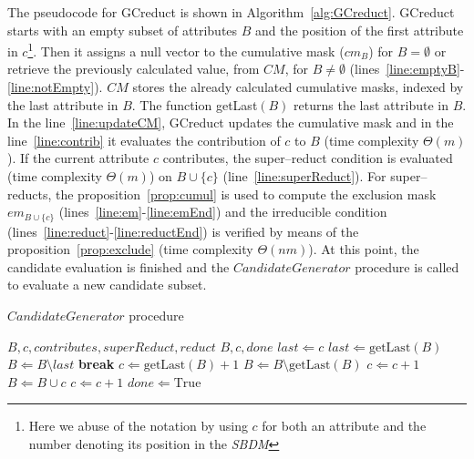 \documentclass[number,preprint,review,12pt]{elsarticle}
\begin{document}
	The pseudocode for GCreduct is shown in Algorithm~\ref{alg:GCreduct}. GCreduct starts with an empty subset of attributes $B$ and the position of the first attribute in $c$\footnote{Here we abuse of the notation by using $c$ for both an attribute and the number denoting its position in the \textit{SBDM}}. Then it assigns a null vector to the cumulative mask ($cm_B$) for $B=\emptyset$ or retrieve the previously calculated value, from $CM$, for $B\neq \emptyset$ (lines~\ref{line:emptyB}-\ref{line:notEmpty}). $CM$ stores the already calculated cumulative masks, indexed by the last attribute in $B$. The function getLast$(B)$ returns the last attribute in $B$. In the line~\ref{line:updateCM}, GCreduct updates the cumulative mask and in the line~\ref{line:contrib} it evaluates the contribution of $c$ to $B$ (time complexity $\Theta(m)$). If the current attribute $c$ contributes, the super--reduct condition is evaluated (time complexity $\Theta(m)$) on $B\cup \lbrace c\rbrace$ (line~\ref{line:superReduct}). For super--reducts, the proposition~\ref{prop:cumul} is used to compute the exclusion mask $em_{B\cup \lbrace c\rbrace}$ (lines~\ref{line:em}-\ref{line:emEnd}) and the irreducible condition (lines~\ref{line:reduct}-\ref{line:reductEnd}) is verified by means of the proposition~\ref{prop:exclude} (time complexity $\Theta(nm)$). At this point, the candidate evaluation is finished and the $CandidateGenerator$ procedure is called to evaluate a new candidate subset.
		
	\begin{algorithm}
		\footnotesize
		\caption{$CandidateGenerator$ procedure}
		\label{alg:CandGenerator}
		\begin{algorithmic}[1]
			\Require \textit{$B,c,contributes,superReduct,reduct$}
			\Ensure $B,c,done$ 
			\label{line:cg} 
			\label{line:gap} 
			\State $last \Leftarrow c$
			\State $last \Leftarrow \mathrm{getLast}(B)$
			\State $B \Leftarrow B\setminus last$
			\State \textbf{break}\label{line:gapEnd}
			\EndIf
			\EndWhile
			\EndIf
			\State $c \Leftarrow  \mathrm{getLast}(B)+1$
			\State $B \Leftarrow B\setminus \mathrm{getLast}(B)$\label{line:remLast}
			\Else
			\label{line:NCorSR}
			\State $c \Leftarrow c+1$\label{line:replaceC}
			\Else
			\State $B \Leftarrow B\cup c$\label{line:add1}
			\State $c \Leftarrow c+1$\label{line:add1End}
			\EndIf
			\EndIf
			 \label{line:done}
			\State $done \Leftarrow \mathrm{True}$
			\EndIf
		\end{algorithmic}
	\end{algorithm}
			
\end{document}
